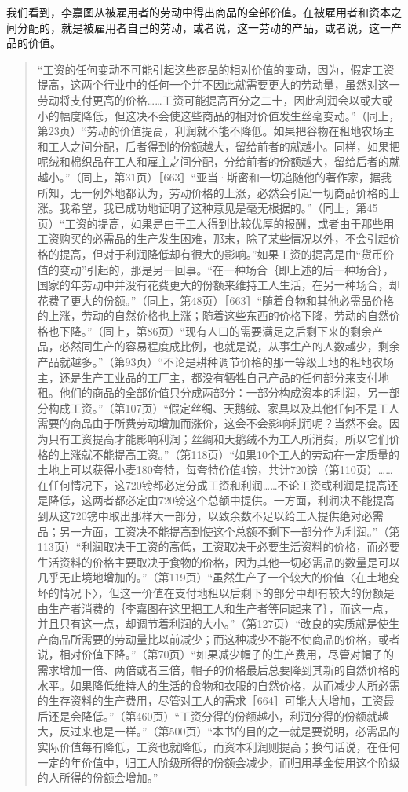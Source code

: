 我们看到，李嘉图从被雇用者的劳动中得出商品的全部价值。在被雇用者和资本之间分配的，就是被雇用者自己的劳动，或者说，这一劳动的产品，或者说，这一产品的价值。

\begin{quote}{“工资的任何变动不可能引起这些商品的相对价值的变动，因为，假定工资提高，这两个行业中的任何一个并不因此就需要更大的劳动量，虽然对这一劳动将支付更高的价格……工资可能提高百分之二十，因此利润会以或大或小的幅度降低，但这决不会使这些商品的相对价值发生丝毫变动。”（同上，第23页）“劳动的价值提高，利润就不能不降低。如果把谷物在租地农场主和工人之间分配，后者得到的份额越大，留给前者的就越小。同样，如果把呢绒和棉织品在工人和雇主之间分配，分给前者的份额越大，留给后者的就越小。”（同上，第31页）［663］“亚当·斯密和一切追随他的著作家，据我所知，无一例外地都认为，劳动价格的上涨，必然会引起一切商品价格的上涨。我希望，我已成功地证明了这种意见是毫无根据的。”（同上，第45页）“工资的提高，如果是由于工人得到比较优厚的报酬，或者由于那些用工资购买的必需品的生产发生困难，那末，除了某些情况以外，不会引起价格的提高，但对于利润降低却有很大的影响。”如果工资的提高是由“货币价值的变动”引起的，那是另一回事。“在一种场合｛即上述的后一种场合｝，国家的年劳动中并没有花费更大的份额来维持工人生活，在另一种场合，却花费了更大的份额。”（同上，第48页）［663］“随着食物和其他必需品价格的上涨，劳动的自然价格也上涨；随着这些东西的价格下降，劳动的自然价格也下降。”（同上，第86页）“现有人口的需要满足之后剩下来的剩余产品，必然同生产的容易程度成比例，也就是说，从事生产的人数越少，剩余产品就越多。”（第93页）“不论是耕种调节价格的那一等级土地的租地农场主，还是生产工业品的工厂主，都没有牺牲自己产品的任何部分来支付地租。他们的商品的全部价值只分成两部分：一部分构成资本的利润，另一部分构成工资。”（第107页）“假定丝绸、天鹅绒、家具以及其他任何不是工人需要的商品由于所费劳动增加而涨价，这会不会影响利润呢？当然不会。因为只有工资提高才能影响利润；丝绸和天鹅绒不为工人所消费，所以它们价格的上涨就不能提高工资。”（第118页）“如果10个工人的劳动在一定质量的土地上可以获得小麦180夸特，每夸特价值4镑，共计720镑（第110页）……在任何情况下，这720镑都必定分成工资和利润……不论工资或利润是提高还是降低，这两者都必定由720镑这个总额中提供。一方面，利润决不能提高到从这720镑中取出那样大一部分，以致余数不足以给工人提供绝对必需品；另一方面，工资决不能提高到使这个总额不剩下一部分作为利润。”（第113页）“利润取决于工资的高低，工资取决于必要生活资料的价格，而必要生活资料的价格主要取决于食物的价格，因为其他一切必需品的数量是可以几乎无止境地增加的。”（第119页）“虽然生产了一个较大的价值〈在土地变坏的情况下〉，但这一价值在支付地租以后剩下的部分中却有较大的份额是由生产者消费的｛李嘉图在这里把工人和生产者等同起来了｝，而这一点，并且只有这一点，却调节着利润的大小。”（第127页）“改良的实质就是使生产商品所需要的劳动量比以前减少；而这种减少不能不使商品的价格，或者说，相对价值下降。”（第70页）“如果减少帽子的生产费用，尽管对帽子的需求增加一倍、两倍或者三倍，帽子的价格最后总要降到其新的自然价格的水平。如果降低维持人的生活的食物和衣服的自然价格，从而减少人所必需的生存资料的生产费用，尽管对工人的需求［664］可能大大增加，工资最后还是会降低。”（第460页）“工资分得的份额越小，利润分得的份额就越大，反过来也是一样。”（第500页）“本书的目的之一就是要说明，必需品的实际价值每有降低，工资也就降低，而资本利润则提高；换句话说，在任何一定的年价值中，归工人阶级所得的份额会减少，而归用基金使用这个阶级的人所得的份额会增加。”}\end{quote}

